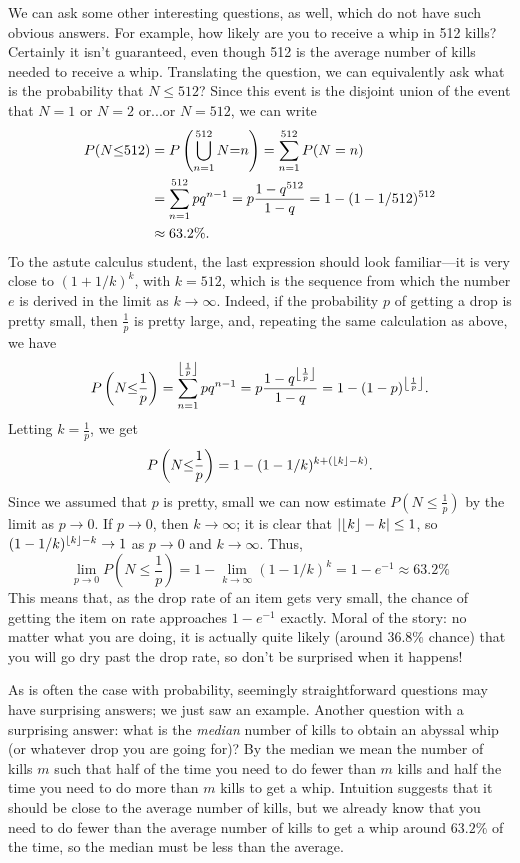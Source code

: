 \documentclass[letterpaper]{article}
\begin{document}
	We can ask some other interesting questions, as well, which do not have such obvious answers. For example, how likely are you to receive a whip in 512 kills? Certainly it isn't guaranteed, even though 512 is the average number of kills needed to receive a whip. Translating the question, we can equivalently ask what is the probability that $N \le 512$? Since this event is the disjoint union of the event that $N=1$ or $N=2$ or...or $N=512$, we can write
	\begin{align}
		\notag
		P(N{\le} 512) &= P\left(\bigcup_{n=1}^{512} N{=}n\right) = \sum_{n=1}^{512}P(N=n) \\
		\notag
		&= \sum_{n=1}^{512} pq^{n-1} = p\frac{1-q^{512}}{1-q} =1 - (1-1/512)^{512} \\
		&\approx 63.2\%.
	\end{align}
	To the astute calculus student, the last expression should look familiar---it is very close to $(1+1/k)^k$, with $k=512$, which is the sequence from which the number $e$ is derived in the limit as $k \to \infty$. Indeed, if the probability $p$ of getting a drop is pretty small, then $\frac{1}{p}$ is pretty large, and, repeating the same calculation as above, we have
	\begin{equation*}
		P\left(N{\le}\frac{1}{p}\right) = \sum_{n=1}^{{\left\lfloor {\frac{1}{p}} \right\rfloor}} pq^{n-1} = p\frac{1-q^{{\left\lfloor {\frac{1}{p}} \right\rfloor}}}{1-q} = 1 - (1-p)^{\left\lfloor {\frac{1}{p}} \right\rfloor}.
	\end{equation*}
	Letting $k = \frac{1}{p}$, we get
	\begin{equation*}
		P\left(N{\le}\frac{1}{p}\right) = 1 - (1-1/k)^{k + \left({\left\lfloor {k} \right\rfloor} - k\right)}.
	\end{equation*}
	Since we assumed that $p$ is pretty, small we can now estimate $P\left(N{\le}\frac{1}{p}\right)$ by the limit as $p \to 0$. If $p \to 0$, then $k \to \infty$; it is clear that $\left|{\left\lfloor {k} \right\rfloor} - k\right| \le 1$, so $(1-1/k)^{{\left\lfloor {k} \right\rfloor} - k} \to 1$ as $p \to 0$ and $k \to \infty$. Thus,
	\begin{equation}
		\lim_{p\to0}P\left(N{\le}\frac{1}{p}\right) = 1 - \lim_{k\to\infty}(1-1/k)^{k} = 1-e^{-1} \approx 63.2\%
	\end{equation}
	This means that, as the drop rate of an item gets very small, the chance of getting the item on rate approaches $1-e^{-1}$ exactly. Moral of the story: no matter what you are doing, it is actually quite likely (around $36.8\%$ chance) that you will go dry past the drop rate, so don't be surprised when it happens!
	
	As is often the case with probability, seemingly straightforward questions may have surprising answers; we just saw an example. Another question with a surprising answer: what is the \textit{median} number of kills to obtain an abyssal whip (or whatever drop you are going for)? By the median we mean the number of kills $m$ such that half of the time you need to do fewer than $m$ kills and half the time you need to do more than $m$ kills to get a whip. Intuition suggests that it should be close to the average number of kills, but we already know that you need to do fewer than the average number of kills to get a whip around $63.2\%$ of the time, so the median must be less than the average. 
	
\end{document}
